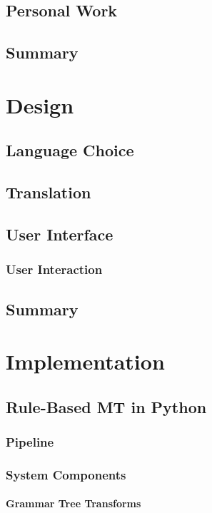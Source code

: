 \documentclass[12pt]{ociamthesis}  %
\begin{document}
\section{Personal Work}
\section{Summary}


\chapter{Design}

\section{Language Choice}
\section{Translation}
\section{User Interface}
	\subsection{User Interaction}
\section{Summary}


\chapter{Implementation}
\label{implementation}

\section{Rule-Based MT in Python}
	\subsection{Pipeline}
	\subsection{System Components}
		\subsubsection{Grammar Tree Transforms}
\end{document}
